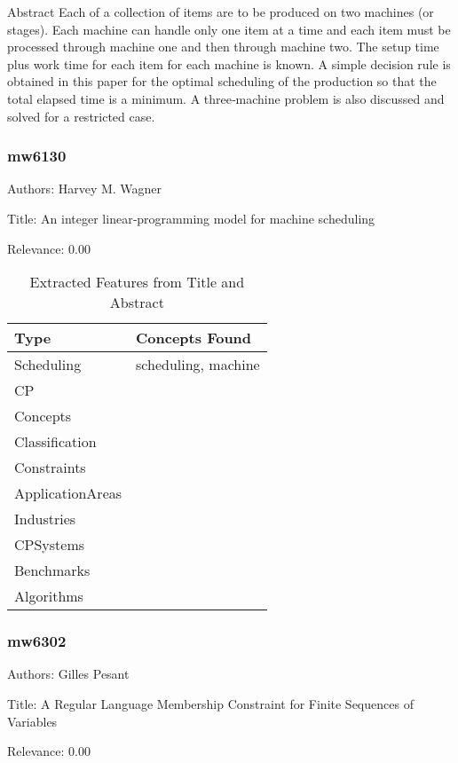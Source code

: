  Abstract  Each of a collection of items are to be produced on two machines (or stages). Each machine can handle only one item at a time and each item must be processed through machine one and then through machine two. The setup time plus work time for each item for each machine is known. A simple decision rule is obtained in this paper for the optimal scheduling of the production so that the total elapsed time is a minimum. A three‐machine problem is also discussed and solved for a restricted case. 

\subsubsection{mw6130}
\label{mw:mw6130}

Authors: Harvey M. Wagner

Title: An integer linear‐programming model for machine scheduling

Relevance:  0.00

{\scriptsize
\begin{longtable}{p{2cm}p{20cm}}
\caption{Extracted Features from Title and Abstract}\\ \toprule
Type & Concepts Found\\ \midrule
\endhead
\bottomrule
\endfoot
Scheduling & scheduling, machine\\ 
CP & \\ 
Concepts & \\ 
Classification & \\ 
Constraints & \\ 
ApplicationAreas & \\ 
Industries & \\ 
CPSystems & \\ 
Benchmarks & \\ 
Algorithms & \\ 
\end{longtable}
}



\subsubsection{mw6302}
\label{mw:mw6302}

Authors: Gilles Pesant

Title: A Regular Language Membership Constraint for Finite Sequences of Variables

Relevance:  0.00

